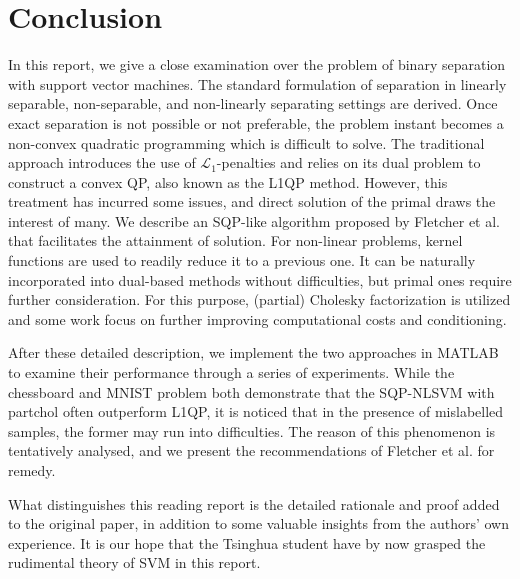 \documentclass[11pt,a4paper]{article}
\theoremstyle{definition}
\begin{document}
  \section{Conclusion\label{Sec:FIN}}
    In this report, we give a close examination over the problem of binary separation with support vector machines. The standard formulation of separation in linearly separable, non-separable, and non-linearly separating settings are derived. Once exact separation is not possible or not preferable, the problem instant becomes a non-convex quadratic programming which is difficult to solve. The traditional approach introduces the use of $\mathcal{L}_{1}$-penalties and relies on its dual problem to construct a convex QP, also known as the L1QP method. However, this treatment has incurred some issues, and direct solution of the primal draws the interest of many. We describe an SQP-like algorithm proposed by Fletcher et al. \cite{fletcher2010binary} that facilitates the attainment of solution. For non-linear problems, kernel functions are used to readily reduce it to a previous one. It can be naturally incorporated into dual-based methods without difficulties, but primal ones require further consideration. For this purpose, (partial) Cholesky factorization is utilized and some work \cite{fletcher2010binary} focus on further improving computational costs and conditioning.

    After these detailed description, we implement the two approaches in \textsf{MATLAB} to examine their performance through a series of experiments. While the chessboard and MNIST problem both demonstrate that the SQP-NLSVM with \textsf{partchol} often outperform L1QP, it is noticed that in the presence of mislabelled samples, the former may run into difficulties. The reason of this phenomenon is tentatively analysed, and we present the recommendations of Fletcher et al. \cite{fletcher2010binary} for remedy.

    What distinguishes this reading report is the detailed rationale and proof added to the original paper, in addition to some valuable insights from the authors' own experience. It is our hope that the Tsinghua student have by now grasped the rudimental theory of SVM in this report.

  
  
\end{document}
